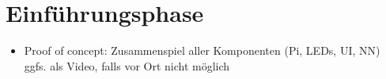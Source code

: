 \section{Einführungsphase}
\label{sec:Einfuehrungsphase}

\begin{itemize}
	\item Proof of concept: Zusammenspiel aller Komponenten (Pi, LEDs, UI, NN) ggfs. als Video, falls vor Ort nicht m\"oglich
\end{itemize}
